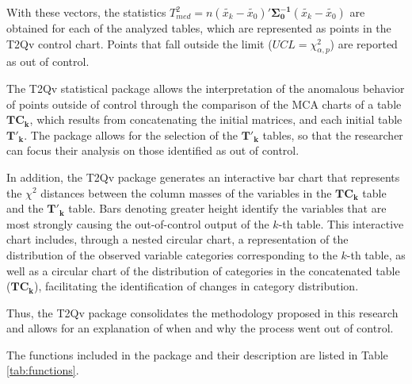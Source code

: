 \documentclass[mathematics,article,submit,moreauthors,pdftex]{mdpi}
\begin{document}
With these vectors, the statistics
\(T^2_{med}=n (\tilde{x_{k}}-\tilde{x_{0}})'\mathbf{\Sigma_{0}^{-1}}(\tilde{x_{k}}-\tilde{x_{0}})\)
are obtained for each of the analyzed tables, which are represented as
points in the T2Qv control chart. Points that fall outside the limit
(\(UCL= \chi_{\alpha,p}^2\)) are reported as out of control.

The T2Qv statistical package allows the interpretation of the anomalous
behavior of points outside of control through the comparison of the MCA
charts of a table \(\mathbf{TC_k}\), which results from concatenating
the initial matrices, and each initial table \(\mathbf{T'_k}\). The
package allows for the selection of the \(\mathbf{T'_k}\) tables, so
that the researcher can focus their analysis on those identified as out
of control.

In addition, the T2Qv package generates an interactive bar chart that
represents the \(\chi^2\) distances between the column masses of the
variables in the \(\mathbf{TC_k}\) table and the \(\mathbf{T'_k}\)
table. Bars denoting greater height identify the variables that are most
strongly causing the out-of-control output of the \(k\)-th table. This
interactive chart includes, through a nested circular chart, a
representation of the distribution of the observed variable categories
corresponding to the \(k\)-th table, as well as a circular chart of the
distribution of categories in the concatenated table
(\(\mathbf{TC_k}\)), facilitating the identification of changes in
category distribution.

Thus, the T2Qv package consolidates the methodology proposed in this
research and allows for an explanation of when and why the process went
out of control.

The functions included in the package and their description are listed
in Table \ref{tab:functions}.
\end{document}

